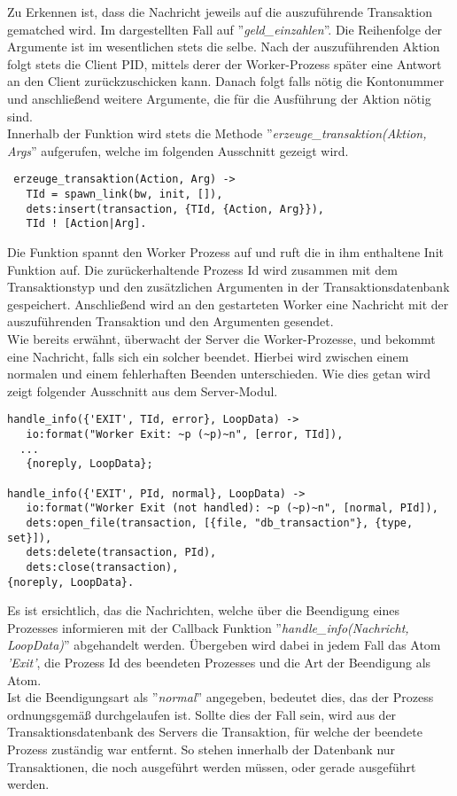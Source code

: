 Zu Erkennen ist, dass die Nachricht jeweils auf die auszuführende Transaktion gematched wird. Im dargestellten Fall auf ''\textit{geld\_einzahlen}''. Die Reihenfolge der Argumente ist im wesentlichen stets die selbe. Nach der auszuführenden Aktion folgt stets die Client PID, mittels derer der Worker-Prozess später eine Antwort an den Client zurückzuschicken kann. Danach folgt falls nötig die Kontonummer und anschließend weitere Argumente, die für die Ausführung der Aktion nötig sind.\\
Innerhalb der Funktion wird stets die Methode ''\textit{erzeuge\_transaktion(Aktion, Args}'' aufgerufen, welche im folgenden Ausschnitt gezeigt wird.
\begin{lstlisting}
 erzeuge_transaktion(Action, Arg) ->
   TId = spawn_link(bw, init, []),
   dets:insert(transaction, {TId, {Action, Arg}}),
   TId ! [Action|Arg].
\end{lstlisting}
Die Funktion spannt den Worker Prozess auf und ruft die in ihm enthaltene Init Funktion auf. Die zurückerhaltende Prozess Id wird zusammen mit dem Transaktionstyp und den zusätzlichen Argumenten in der Transaktionsdatenbank gespeichert. Anschließend wird an den gestarteten Worker eine Nachricht mit der auszuführenden Transaktion und den Argumenten gesendet.\\
Wie bereits erwähnt, überwacht der Server die Worker-Prozesse, und bekommt eine Nachricht, falls sich ein solcher beendet. Hierbei wird zwischen einem normalen und einem fehlerhaften Beenden unterschieden. Wie dies getan wird zeigt folgender Ausschnitt aus dem Server-Modul.
\begin{lstlisting}
handle_info({'EXIT', TId, error}, LoopData) -> 
   io:format("Worker Exit: ~p (~p)~n", [error, TId]),
  ...
   {noreply, LoopData};

handle_info({'EXIT', PId, normal}, LoopData) -> 
   io:format("Worker Exit (not handled): ~p (~p)~n", [normal, PId]),
   dets:open_file(transaction, [{file, "db_transaction"}, {type, set}]),
   dets:delete(transaction, PId),
   dets:close(transaction),
{noreply, LoopData}.
\end{lstlisting}
Es ist ersichtlich, das die Nachrichten, welche über die Beendigung eines Prozesses informieren mit der Callback Funktion ''\textit{handle\_info(Nachricht, LoopData)}'' abgehandelt werden. Übergeben wird dabei in jedem Fall das Atom \textit{'Exit'}, die Prozess Id des beendeten Prozesses und die Art der Beendigung als Atom.\\
Ist die Beendigungsart als ''\textit{normal}'' angegeben, bedeutet dies, das der Prozess ordnungsgemäß durchgelaufen ist. Sollte dies der Fall sein, wird aus der Transaktionsdatenbank des Servers die Transaktion, für welche der beendete Prozess zuständig war entfernt. So stehen innerhalb der Datenbank nur Transaktionen, die noch ausgeführt werden müssen, oder gerade ausgeführt werden.\\

